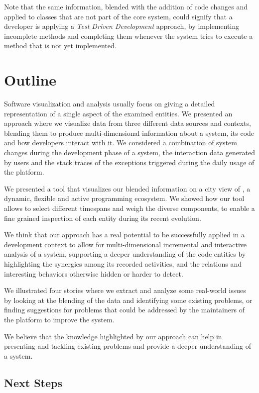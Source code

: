 Note that the same information, blended with the addition of code changes and applied to classes that are not part of the core system, could signify that a developer is applying a \textit{Test Driven Development} approach, by implementing incomplete methods and completing them whenever the system tries to execute a method that is not yet implemented.



\section{Outline}\label{sec:blend-summary}

Software visualization and analysis usually focus on giving a detailed representation of a single aspect of the examined entities.
We presented an approach where we visualize data from three different data sources and contexts, blending them to produce multi-dimensional information about a system, its code and how developers interact with it.
We considered a combination of system changes during the development phase of a system, the interaction data generated by users and the stack traces of the exceptions triggered during the daily usage of the platform.

We presented a tool that visualizes our blended information on a city view of \pha, a dynamic, flexible and active programming ecosystem.
We showed how our tool allows to select different timespans and weigh the diverse components, to enable a fine grained inspection of each entity during its recent evolution.

We think that our approach has a real potential to be successfully applied in a development context to allow for multi-dimensional incremental and interactive analysis of a system, supporting a deeper understanding of the code entities by highlighting the synergies among its recorded activities, and the relations and interesting behaviors otherwise hidden or harder to detect.

We illustrated four stories where we extract and analyze some real-world issues by looking at the blending of the data and identifying some existing problems, or finding suggestions for problems that could be addressed by the maintainers of the platform to improve the system.

We believe that the knowledge highlighted by our approach can help in presenting and tackling existing problems and provide a deeper understanding of a system.

\subsection{Next Steps}

